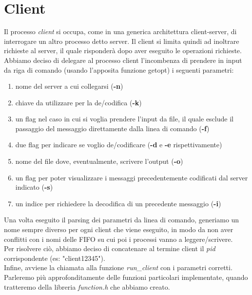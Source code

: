 \documentclass[a4paper,9pt]{article}
\begin{document}
\section{Client}
Il processo \emph{client} si occupa, come in una generica architettura client-server, di interrogare un altro processo detto server. Il client si limita quindi ad inoltrare richieste al server, il quale risponderà dopo aver eseguito le operazioni richieste.\\
Abbiamo deciso di delegare al processo client l'incombenza di prendere in input da riga di comando (usando l'apposita funzione getopt) i seguenti parametri:
\begin{enumerate}
\item nome del server a cui collegarsi (\textbf{-n})
\item chiave da utilizzare per la de/codifica (\textbf{-k})
\item un flag nel caso in cui si voglia prendere l'input da file, il quale esclude il passaggio del messaggio direttamente dalla linea di comando (\textbf{-f})
\item due flag per indicare se voglio de/codificare (\textbf{-d} e \textbf{-e} rispettivamente)
\item nome del file dove, eventualmente, scrivere l'output (\textbf{-o})
\item un flag per poter visualizzare i messaggi precedentemente codificati dal server indicato (\textbf{-s})
\item un indice per richiedere la decodifica di un precedente messaggio (\textbf{-i})
\end{enumerate}
Una volta eseguito il parsing dei parametri da linea di comando, generiamo un nome sempre diverso per ogni client che viene eseguito, in modo da non aver conflitti con i nomi delle FIFO su cui poi i processi vanno a leggere/scrivere.\\
Per risolvere ciò, abbiamo deciso di concatenare al termine client il \emph{pid} corrispondente (es: "client12345").\\
Infine, avviene la chiamata alla funzione \emph{run\_client} con i parametri corretti. Parleremo più approfonditamente delle funzioni particolari implementate, quando tratteremo della libreria \emph{function.h} che abbiamo creato.
\end{document}
